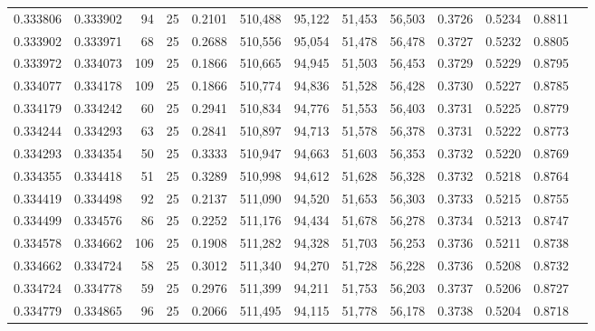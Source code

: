 \begin{tabular}{rrrrrrrrrrrrr}
0.333806 & 0.333902 &    94 &  25 &                                     0.2101 & 510,488 &  95,122 &  51,453 &  56,503 & 0.3726 & 0.5234 & 0.8811 \\
0.333902 & 0.333971 &    68 &  25 &                                     0.2688 & 510,556 &  95,054 &  51,478 &  56,478 & 0.3727 & 0.5232 & 0.8805 \\
0.333972 & 0.334073 &   109 &  25 &                                     0.1866 & 510,665 &  94,945 &  51,503 &  56,453 & 0.3729 & 0.5229 & 0.8795 \\
0.334077 & 0.334178 &   109 &  25 &                                     0.1866 & 510,774 &  94,836 &  51,528 &  56,428 & 0.3730 & 0.5227 & 0.8785 \\
0.334179 & 0.334242 &    60 &  25 &                                     0.2941 & 510,834 &  94,776 &  51,553 &  56,403 & 0.3731 & 0.5225 & 0.8779 \\
0.334244 & 0.334293 &    63 &  25 &                                     0.2841 & 510,897 &  94,713 &  51,578 &  56,378 & 0.3731 & 0.5222 & 0.8773 \\
0.334293 & 0.334354 &    50 &  25 &                                     0.3333 & 510,947 &  94,663 &  51,603 &  56,353 & 0.3732 & 0.5220 & 0.8769 \\
0.334355 & 0.334418 &    51 &  25 &                                     0.3289 & 510,998 &  94,612 &  51,628 &  56,328 & 0.3732 & 0.5218 & 0.8764 \\
0.334419 & 0.334498 &    92 &  25 &                                     0.2137 & 511,090 &  94,520 &  51,653 &  56,303 & 0.3733 & 0.5215 & 0.8755 \\
0.334499 & 0.334576 &    86 &  25 &                                     0.2252 & 511,176 &  94,434 &  51,678 &  56,278 & 0.3734 & 0.5213 & 0.8747 \\
0.334578 & 0.334662 &   106 &  25 &                                     0.1908 & 511,282 &  94,328 &  51,703 &  56,253 & 0.3736 & 0.5211 & 0.8738 \\
0.334662 & 0.334724 &    58 &  25 &                                     0.3012 & 511,340 &  94,270 &  51,728 &  56,228 & 0.3736 & 0.5208 & 0.8732 \\
0.334724 & 0.334778 &    59 &  25 &                                     0.2976 & 511,399 &  94,211 &  51,753 &  56,203 & 0.3737 & 0.5206 & 0.8727 \\
0.334779 & 0.334865 &    96 &  25 &                                     0.2066 & 511,495 &  94,115 &  51,778 &  56,178 & 0.3738 & 0.5204 & 0.8718 \\

\end{tabular}
